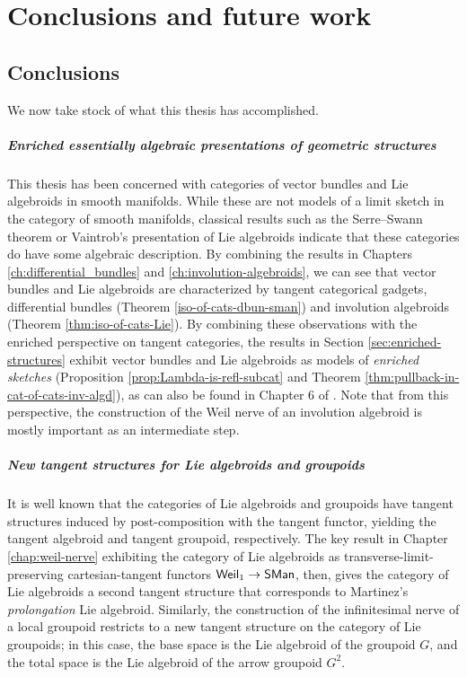 
% 
\chapter{Conclusions and future work}

\section{Conclusions}

We now take stock of what this thesis has accomplished.

\paragraph{Enriched essentially algebraic presentations of geometric structures}

This thesis has been concerned with categories of vector bundles and Lie algebroids in smooth manifolds.
While these are not models of a limit sketch in the category of smooth manifolds, classical results such as the Serre--Swann theorem or Vaintrob's presentation of Lie algebroids indicate that these categories do have some algebraic description.
By combining the results in Chapters \ref{ch:differential_bundles} and \ref{ch:involution-algebroids}, we can see that vector bundles and Lie algebroids are characterized by tangent categorical gadgets, differential bundles (Theorem \ref{iso-of-cats-dbun-sman}) and involution algebroids (Theorem \ref{thm:iso-of-cats-Lie}).
By combining these observations with the enriched perspective on tangent categories, the results in Section \ref{sec:enriched-structures} exhibit vector bundles and Lie algebroids as models of \emph{enriched sketches} (Proposition \ref{prop:Lambda-is-refl-subcat} and Theorem \ref{thm:pullback-in-cat-of-cats-inv-algd}), as can also be found in Chapter 6 of \cite{Kelly2005}.
Note that from this perspective, the construction of the Weil nerve of an involution algebroid is mostly important as an intermediate step.

\paragraph{New tangent structures for Lie algebroids and groupoids}

It is well known that the categories of Lie algebroids and groupoids have tangent structures induced by post-composition with the tangent functor, yielding the tangent algebroid and tangent groupoid, respectively.
The key result in Chapter \ref{chap:weil-nerve} exhibiting the category of Lie algebroids as transverse-limit-preserving cartesian-tangent functors $\mathsf{Weil}_1 \to \mathsf{SMan}$, then, gives the category of Lie algebroids a second tangent structure that corresponds to Martinez's \emph{prolongation} Lie algebroid. 
Similarly, the construction of the infinitesimal nerve of a local groupoid restricts to a new tangent structure on the category of Lie groupoids; in this case, the base space is the Lie algebroid of the groupoid $G$, and the total space is the Lie algebroid of the arrow groupoid $G^2$. 

